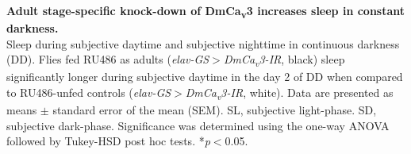 \label{fig:S4}
\textbf{Adult stage-specific knock-down of DmCa\textsubscript{v}3 increases sleep in constant darkness.}
\\
Sleep during subjective daytime and subjective nighttime in continuous darkness (DD). 
Flies fed RU486 as adults (\emph{elav-GS$>$DmCa\textsubscript{v}3-IR}, black) sleep significantly longer during subjective daytime in the day 2 of DD when compared to RU486-unfed controls (\emph{elav-GS$>$DmCa\textsubscript{v}3-IR}, white).
Data are presented as means $\pm$ standard error of the mean (SEM).
SL, subjective light-phase.
SD, subjective dark-phase.
Significance was determined using the one-way ANOVA followed by Tukey-HSD post hoc tests.
*\emph{p}$<$0.05.

  